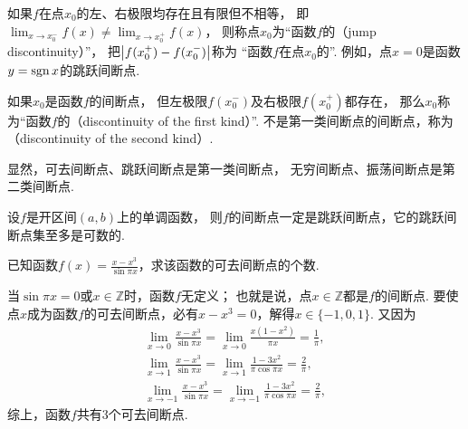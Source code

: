 如果\(f\)在点\(x_0\)的左、右极限均存在且有限但不相等，
即\(\lim_{x \to x_0^-} f(x) \neq \lim_{x \to x_0^+} f(x)\)，
则称点\(x_0\)为“函数\(f\)的（jump discontinuity）”，
把\(\abs{f(x_0^+)-f(x_0^-)}\)称为
“函数\(f\)在点\(x_0\)的”.
例如，点\(x=0\)是函数\(y=\operatorname{sgn} x\)的跳跃间断点.

如果\(x_0\)是函数\(f\)的间断点，
但左极限\(f(x_0^-)\)及右极限\(f(x_0^+)\)都存在，
那么\(x_0\)称为“函数\(f\)的（discontinuity of the first kind）”.
不是第一类间断点的间断点，称为（discontinuity of the second kind）.

显然，可去间断点、跳跃间断点是第一类间断点，
无穷间断点、振荡间断点是第二类间断点.

\begin{theorem}
设\(f\)是开区间\((a,b)\)上的单调函数，
则\(f\)的间断点一定是跳跃间断点，它的跳跃间断点集至多是可数的.
\end{theorem}

\begin{example}
已知函数\(f(x) = \frac{x-x^3}{\sin \pi x}\)，求该函数的可去间断点的个数.
\begin{solution}
当\(\sin \pi x = 0\)或\(x \in \mathbb{Z}\)时，函数\(f\)无定义；
也就是说，点\(x\in\mathbb{Z}\)都是\(f\)的间断点.
要使点\(x\)成为函数\(f\)的可去间断点，必有\(x-x^3=0\)，解得\(x\in\{-1,0,1\}\).
又因为\begin{gather*}
	\lim_{x\to0} \frac{x-x^3}{\sin \pi x}
	= \lim_{x\to0} \frac{x(1-x^2)}{\pi x}
	= \frac1\pi, \\
	\lim_{x\to1} \frac{x-x^3}{\sin \pi x}
	= \lim_{x\to1} \frac{1-3x^2}{\pi \cos \pi x}
	= \frac2\pi, \\
	\lim_{x\to-1} \frac{x-x^3}{\sin \pi x}
	= \lim_{x\to-1} \frac{1-3x^2}{\pi \cos \pi x}
	= \frac2\pi,
\end{gather*}
综上，函数\(f\)共有3个可去间断点.
\end{solution}
\end{example}

